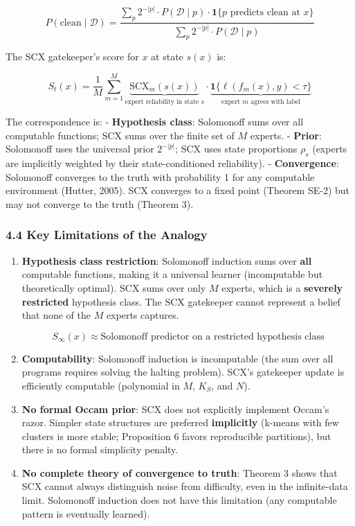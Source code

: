 \documentclass[
  12pt,
]{ctexart}
\begin{document}
\[P(\text{clean} \mid \mathcal{D}) = \frac{\sum_p 2^{-|p|} \cdot P(\mathcal{D} \mid p) \cdot \mathbf{1}\{p \text{ predicts clean at } x\}}{\sum_p 2^{-|p|} \cdot P(\mathcal{D} \mid p)}\]

The SCX gatekeeper's score for \(x\) at state \(s(x)\) is:

\[S_t(x) = \frac{1}{M}\sum_{m=1}^M \underbrace{\text{SCX}_m(s(x))}_{\text{expert reliability in state } s} \cdot \underbrace{\mathbf{1}\{\ell(f_m(x), y) < \tau\}}_{\text{expert } m \text{ agrees with label}}\]

The correspondence is: - \textbf{Hypothesis class}: Solomonoff sums over
all computable functions; SCX sums over the finite set of \(M\) experts.
- \textbf{Prior}: Solomonoff uses the universal prior \(2^{-|p|}\); SCX
uses state proportions \(\rho_s\) (experts are implicitly weighted by
their state-conditioned reliability). - \textbf{Convergence}: Solomonoff
converges to the truth with probability 1 for any computable environment
(Hutter, 2005). SCX converges to a fixed point (Theorem SE-2) but may
not converge to the truth (Theorem 3).

\subsubsection{4.4 Key Limitations of the
Analogy}\label{key-limitations-of-the-analogy}

\begin{enumerate}
\def\labelenumi{\arabic{enumi}.}
\item
  \textbf{Hypothesis class restriction}: Solomonoff induction sums over
  \textbf{all} computable functions, making it a universal learner
  (incomputable but theoretically optimal). SCX sums over only \(M\)
  experts, which is a \textbf{severely restricted} hypothesis class. The
  SCX gatekeeper cannot represent a belief that none of the \(M\)
  experts captures.

  \[S_\infty(x) \approx \text{Solomonoff predictor on a restricted hypothesis class}\]
\item
  \textbf{Computability}: Solomonoff induction is incomputable (the sum
  over all programs requires solving the halting problem). SCX's
  gatekeeper update is efficiently computable (polynomial in \(M\),
  \(K_S\), and \(N\)).
\item
  \textbf{No formal Occam prior}: SCX does not explicitly implement
  Occam's razor. Simpler state structures are preferred
  \textbf{implicitly} (k-means with few clusters is more stable;
  Proposition 6 favors reproducible partitions), but there is no formal
  simplicity penalty.
\item
  \textbf{No complete theory of convergence to truth}: Theorem 3 shows
  that SCX cannot always distinguish noise from difficulty, even in the
  infinite-data limit. Solomonoff induction does not have this
  limitation (any computable pattern is eventually learned).
\end{enumerate}
\end{document}

